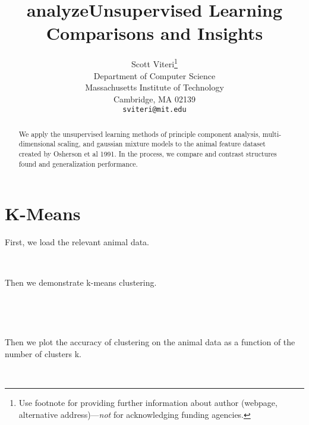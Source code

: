 \documentclass{article} %
\title{analyze}
\title{Unsupervised Learning Comparisons and Insights}
\author{
Scott Viteri\thanks{ Use footnote for providing further information
about author (webpage, alternative address)---\emph{not} for acknowledging
funding agencies.} \\
Department of Computer Science\\
Massachusetts Institute of Technology\\
Cambridge, MA 02139 \\
\texttt{sviteri@mit.edu} \\
}
\begin{document}
\maketitle

\begin{abstract}

We apply the unsupervised learning methods of principle component analysis, multi-dimensional scaling, and gaussian mixture models to the animal feature dataset created by Osherson et al 1991. 
In the process, we compare and contrast structures found and generalization performance.

\end{abstract}

\section{K-Means}

First, we load the relevant animal data.

    \begin{center}
    \end{center}
    { \hspace*{\fill} \\}
    
Then we demonstrate k-means clustering.

    \begin{center}
    \end{center}
    { \hspace*{\fill} \\}


    \begin{center}
    \end{center}
    { \hspace*{\fill} \\}

Then we plot the accuracy of clustering on the animal data as a function of the number of clusters k. 
            
    \begin{center}
    \end{center}
    { \hspace*{\fill} \\}
\end{document}
